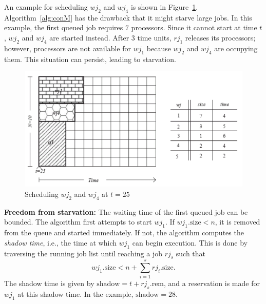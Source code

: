 \documentclass[12pt]{book}
\begin{document}
An example for scheduling $wj_2$ and $wj_4$ is shown in Figure~\ref{fig:sched12}. Algorithm~\ref{alg:conM} has the drawback that it might starve large jobs. In this example, the first queued job requires $7$ processors. Since it cannot start at time $t$, $wj_2$ and $wj_4$ are started instead. After $3$ time units, $rj_1$ releases its processors; however, processors are not available for $wj_1$ because $wj_2$ and $wj_4$ are occupying them. This situation can persist, leading to starvation.  
\begin{figure}[ht]
    \centering
    \includegraphics[width=0.75\linewidth]{images/schedwj12.png}
    \caption{Scheduling $wj_2$ and $wj_4$ at $t=25$}
    \label{fig:sched12}
\end{figure}
\textbf{Freedom from starvation:} The waiting time of the first queued job can be bounded. The algorithm first attempts to start $wj_1$. If $wj_1.\text{size} < n$, it is removed from the queue and started immediately. If not, the algorithm computes the \emph{shadow time}, i.e., the time at which $wj_1$ can begin execution. This is done by traversing the running job list until reaching a job $rj_s$ such that  
\[
wj_1.\text{size} < n + \sum_{i=1}^s rj_i.\text{size}.
\]  
The shadow time is given by $\text{shadow} = t + rj_s.\text{rem}$, and a reservation is made for $wj_1$ at this shadow time. In the example, $\text{shadow} = 28$.
\end{document}
